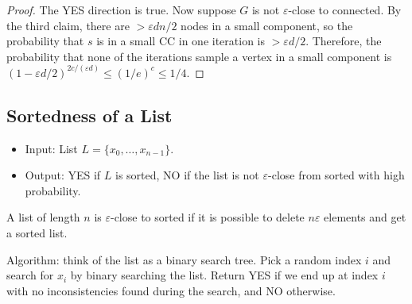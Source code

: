 \begin{proof}
The YES direction is true. Now suppose $G$ is not $\varepsilon$-close to connected. By the third claim, there are $>\varepsilon dn/2$ nodes in a small component, so the probability that $s$ is in a small CC in one iteration is $ > \varepsilon d/2$. Therefore, the probability that none of the iterations sample a vertex in a small component is $(1-\varepsilon d/2)^{2c/(\varepsilon d)}\leq (1/e)^c\leq 1/4$. 
\end{proof}

\subsection{Sortedness of a List}

\begin{itemize}
    \item Input: List $L=\{x_0, \hdots, x_{n-1}\}.$
    \item Output: YES if $L$ is sorted, NO if the list is not $\varepsilon$-close from sorted with high probability. 
\end{itemize}

\begin{definition}

A list of length $n$ is $\varepsilon$-close to sorted if it is possible to delete $n\varepsilon$ elements and get a sorted list.
\end{definition}

\hrulebar

Algorithm: think of the list as a binary search tree. Pick a random index $i$ and search for $x_i$ by binary searching the list. Return YES if we end up at index $i$ with no inconsistencies found during the search, and NO otherwise. 